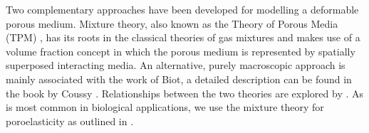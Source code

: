 Two complementary approaches have been developed for modelling a deformable porous medium. Mixture theory, also known as the Theory of Porous Media (TPM) \cite{bowenporouslectures,bowen1980incompressible,boer2005trends}, has its roots in the classical theories of gas mixtures and makes use of a volume fraction concept in which the porous medium is represented by spatially superposed interacting media. An alternative, purely macroscopic approach is mainly associated with the work of Biot, a detailed description can be found in the book by Coussy \cite{coussy2004poromechanics}. Relationships between the two theories are explored by \cite{coussy1998mixture}. As is most common in biological applications, we use the mixture theory for poroelasticity as outlined in \cite{boer2005trends}.